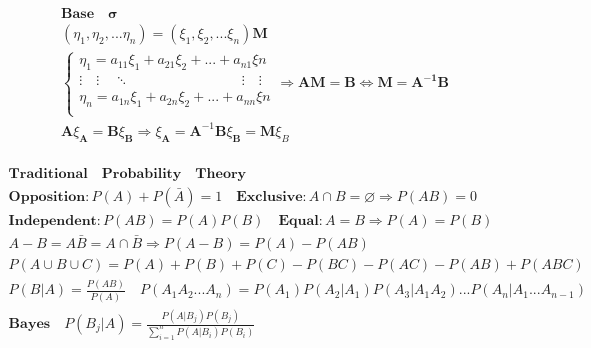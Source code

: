 \documentclass{article}
\begin{document}
\clearpage
\begin{align*} 
    \bm{Base \quad \sigma} \\ 
    (\eta_{1},\eta_{2},...\eta_{n}) = (\xi_{1},\xi_{2},...\xi_{n})\mathbf{M} \\ 
    \left\{
        \begin{array}{rl}
            \eta_{1} = a_{11}\xi_{1} + a_{21}\xi_{2}+...+a_{n1}\xi{n} \\
            \vdots \quad \vdots \quad \ddots  \qquad \qquad \qquad \qquad \vdots \quad \vdots  \\
            \eta_{n} = a_{1n}\xi_{1} + a_{2n}\xi_{2}+...+a_{nn}\xi{n} \\
        \end{array} \Longrightarrow \mathbf{A}\mathbf{M} = \mathbf{B} \Longleftrightarrow \mathbf{M} = \mathbf{A^{-1}}\mathbf{B} 
    \right. \\ 
    \mathbf{A}\xi_{\mathbf{A}} = \mathbf{B}\xi_{\mathbf{B}} \Longrightarrow \xi_{\mathbf{A}} = \mathbf{A}^{-1}\mathbf{B}\xi_{\mathbf{B}} = \mathbf{M}\xi_{B}\\ 
\end{align*}

\clearpage 
\begin{align*}
    \bm{Traditional \quad Probability \quad Theory} \\ 
    \bm{Opposition}: P(A)+P(\bar{A}) = 1 \quad \bm{Exclusive}: A\cap B = \varnothing \Rightarrow P(AB)=0\\ 
    \bm{Independent}: P(AB) = P(A)P(B) \quad \bm{Equal}: A = B \Rightarrow P(A) = P(B)\\ 
    A - B = A\bar{B} = A \cap \bar{B} \Rightarrow P(A-B) = P(A) - P(AB) \\ 
    P(A \cup B \cup C) = P(A)+P(B)+P(C)-P(BC)-P(AC)-P(AB)+P(ABC) \\ 
    P(B|A) = \frac{P(AB)}{P(A)} \quad P(A_{1}A_{2}...A_{n}) = P(A_{1})P(A_{2}|A_{1})P(A_{3}|A_{1}A_{2})...P(A_{n}|A_{1}...A_{n-1}) \\
    \bm{Bayes} \quad P(B_{j}|A) = \frac{P(A|B_{j})P(B_{j})}{\sum_{i=1}^n P(A|B_{i})P(B_{i})}\\  
\end{align*}

\clearpage
\end{document}
